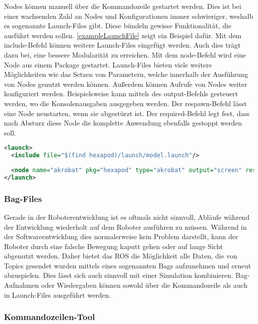 Nodes können manuell über die Kommandozeile gestartet werden. Dies ist bei einer wachsenden Zahl an Nodes und Konfigurationen immer schwieriger, weshalb es sogenannte Launch-Files gibt. Diese bündeln gewisse Funktionalität, die ausführt werden sollen. \autoref{exampleLaunchFile} zeigt ein Beispiel dafür. Mit dem include-Befehl können weitere Launch-Files eingefügt werden. Auch dies trägt dazu bei, eine bessere Modularität zu erreichen. Mit dem node-Befehl wird eine Node aus einem Package gestartet. Launch-Files bieten viele weitere Möglichkeiten wie das Setzen von Parametern, welche innerhalb der Ausführung von Nodes genutzt werden können. Außerdem können Aufrufe von Nodes weiter konfiguriert werden. Beispielsweise kann mittels des output-Befehls gesteuert werden, wo die Konsolenausgaben ausgegeben werden. Der respawn-Befehl lässt eine Node neustarten, wenn sie abgestürzt ist. Der required-Befehl legt fest, dass nach Absturz diese Node die komplette Anwendung ebenfalls gestoppt werden soll.

\begin{lstlisting}[label={exampleLaunchFile}, language=Xml, caption={Beispiel eines Launch-Files}]
<launch>
  <include file="$(find hexapod)/launch/model.launch"/>
  
  <node name="akrobat" pkg="hexapod" type="akrobat" output="screen" respawn="false" required="true"></node>
</launch>
\end{lstlisting}
  
\subsubsection{Bag-Files}

Gerade in der Roboterentwicklung ist es oftmals nicht sinnvoll, Abläufe während der Entwicklung wiederholt auf dem Roboter ausführen zu müssen. Während in der Softwareentwicklung dies normalerweise kein Problem darstellt, kann der Roboter durch eine falsche Bewegung kaputt gehen oder auf lange Sicht abgenutzt werden. Daher bietet das \ac{ROS} die Möglichkeit alle Daten, die von Topics gesendet wurden mittels eines sogenannten Bags aufzunehmen und erneut abzuspielen. Dies lässt sich auch sinnvoll mit einer Simulation kombinieren. Bag-Aufnahmen oder Wiedergaben können sowohl über die Kommandozeile als auch in Launch-Files ausgeführt werden.

\subsubsection{Kommandozeilen-Tool}


